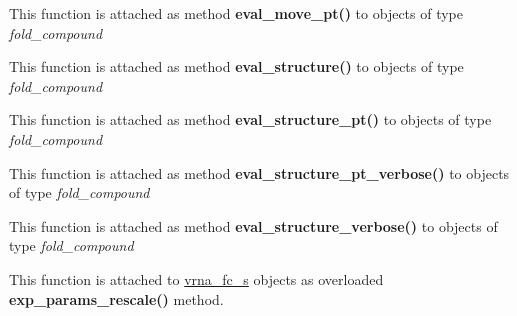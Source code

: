 \begin{DoxyRefList}
\item[\label{wrappers__wrappers000029}%
\Hypertarget{wrappers__wrappers000029}%
Global \mbox{\hyperlink{group__eval_ga123dabc119ea98c968a5e903cc46f0fb}{vrna\+\_\+eval\+\_\+move\+\_\+pt}} (vrna\+\_\+fold\+\_\+compound\+\_\+t $\ast$vc, short $\ast$pt, int m1, int m2)]This function is attached as method {\bfseries eval\+\_\+move\+\_\+pt()} to objects of type {\itshape fold\+\_\+compound}  
\item[\label{wrappers__wrappers000022}%
\Hypertarget{wrappers__wrappers000022}%
Global \mbox{\hyperlink{group__eval_ga58f199f1438d794a265f3b27fc8ea631}{vrna\+\_\+eval\+\_\+structure}} (vrna\+\_\+fold\+\_\+compound\+\_\+t $\ast$vc, const char $\ast$structure)]This function is attached as method {\bfseries eval\+\_\+structure()} to objects of type {\itshape fold\+\_\+compound}  
\item[\label{wrappers__wrappers000023}%
\Hypertarget{wrappers__wrappers000023}%
Global \mbox{\hyperlink{group__eval_gadbd09372ddfd7a450bbd590c96a6bfe4}{vrna\+\_\+eval\+\_\+structure\+\_\+pt}} (vrna\+\_\+fold\+\_\+compound\+\_\+t $\ast$vc, const short $\ast$pt)]This function is attached as method {\bfseries eval\+\_\+structure\+\_\+pt()} to objects of type {\itshape fold\+\_\+compound}  
\item[\label{wrappers__wrappers000025}%
\Hypertarget{wrappers__wrappers000025}%
Global \mbox{\hyperlink{group__eval_ga8a517cfeeae8c376ae7b1e0c401d38b4}{vrna\+\_\+eval\+\_\+structure\+\_\+pt\+\_\+verbose}} (vrna\+\_\+fold\+\_\+compound\+\_\+t $\ast$vc, const short $\ast$pt, F\+I\+LE $\ast$file)]This function is attached as method {\bfseries eval\+\_\+structure\+\_\+pt\+\_\+verbose()} to objects of type {\itshape fold\+\_\+compound}  
\item[\label{wrappers__wrappers000024}%
\Hypertarget{wrappers__wrappers000024}%
Global \mbox{\hyperlink{group__eval_ga0928d699d310178f84ee2351034e5cb5}{vrna\+\_\+eval\+\_\+structure\+\_\+verbose}} (vrna\+\_\+fold\+\_\+compound\+\_\+t $\ast$vc, const char $\ast$structure, F\+I\+LE $\ast$file)]This function is attached as method {\bfseries eval\+\_\+structure\+\_\+verbose()} to objects of type {\itshape fold\+\_\+compound}  
\item[\label{wrappers__wrappers000044}%
\Hypertarget{wrappers__wrappers000044}%
Global \mbox{\hyperlink{group__energy__parameters_gad607bc3a5b5da16400e2ca4ea5560233}{vrna\+\_\+exp\+\_\+params\+\_\+rescale}} (vrna\+\_\+fold\+\_\+compound\+\_\+t $\ast$vc, double $\ast$mfe)]This function is attached to \mbox{\hyperlink{group__fold__compound_structvrna__fc__s}{vrna\+\_\+fc\+\_\+s}} objects as overloaded {\bfseries exp\+\_\+params\+\_\+rescale()} method.


\end{DoxyRefList}
